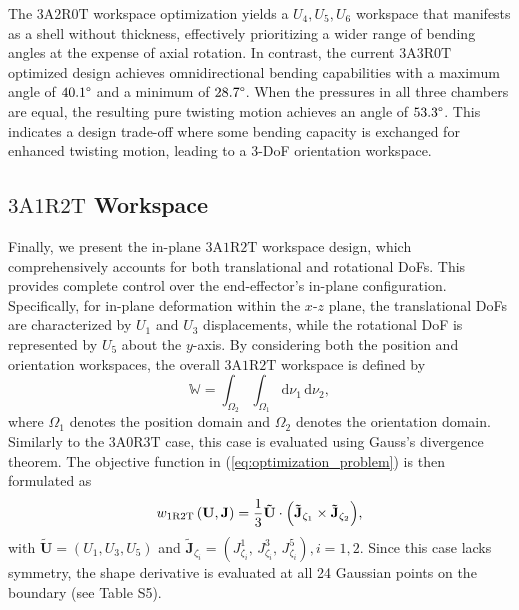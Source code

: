 \documentclass[journal]{IEEEtran}
\theoremstyle{definition}
\begin{document}
The $3\text{A}2\text{R}0\text{T}$ workspace optimization yields a $U_4, U_5, U_6$ workspace that manifests as a shell without thickness, effectively prioritizing a wider range of bending angles at the expense of axial rotation. In contrast, the current $3\text{A}3\text{R}0\text{T}$ optimized design achieves omnidirectional bending capabilities with a maximum angle of $40.1\degree$ and a minimum of $28.7\degree$. When the pressures in all three chambers are equal, the resulting pure twisting motion achieves an angle of $53.3\degree$. This indicates a design trade-off where some bending capacity is exchanged for enhanced twisting motion, leading to a 3-DoF orientation workspace.


\subsection{$3 \text{A} 1 \text{R} 2 \text{T}$ Workspace}


Finally, we present the in-plane $3\text{A}1\text{R}2\text{T}$ workspace design, which comprehensively accounts for both translational and rotational DoFs. This provides complete control over the end-effector's in-plane configuration. Specifically, for in-plane deformation within the $x$-$z$ plane, the translational DoFs are characterized by $U_1$ and $U_3$ displacements, while the rotational DoF is represented by $U_5$ about the $y$-axis. By considering both the position and orientation workspaces, the overall $3 \text{A} 1 \text{R} 2 \text{T}$ workspace is defined by
\begin{equation}
  \mathbb{W} = \int_{\Omega_{2}}\int_{\Omega_{1}} \mathrm{d}\nu_1\,\mathrm{d}\nu_2,
\end{equation}
where $\Omega_1$ denotes the position domain and $\Omega_2$ denotes the orientation domain. Similarly to the $3 \text{A} 0 \text{R} 3 \text{T}$ case, this case is evaluated using Gauss's divergence  theorem. The objective function in (\ref{eq:optimization_problem}) is then formulated as
\begin{equation}
  w_{1 \text{R} 2 \text{T}} \left(\mathbf{U}, \mathbf{J}\right)= \frac{1}{3} 
    \mathbf{\tilde{U}} \cdot \Bigl( \mathbf{\tilde{J}}_{\zeta_1} \times \mathbf{\tilde{J}}_{\zeta_2} \Bigr)
  ,
\end{equation}
with $\mathbf{\tilde{U}} = \left(U_1, U_3, U_5\right)$ and $
\mathbf{\tilde{J}}_{\zeta_i} = \left(J^1_{\zeta_i},\, J^3_{\zeta_i},\, J^5_{\zeta_i}\right), i=1,2
$. Since this case lacks symmetry, the shape derivative is evaluated at all 24 Gaussian points on the boundary (see Table S5).
\end{document}
